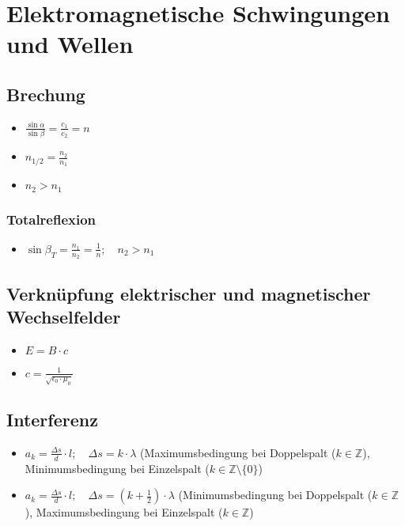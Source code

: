 \documentclass[paper = a4, twocolumn]{scrartcl}
\begin{document}
\section{Elektromagnetische Schwingungen und Wellen}
\subsection{Brechung}
\begin{itemize}
\item
	\( \frac{\sin \alpha}{\sin \beta} = \frac{c_1}{c_2} = n \)
\item
	\( n_{1/2} = \frac{n_2}{n_1} \)
\item
	\( n_2 > n_1 \)
\end{itemize}

\subsubsection{Totalreflexion}
\begin{itemize}
\item
	\( \sin \beta_T = \frac{n_1}{n_2} = \frac{1}{n}; \quad n_2 > n_1 \)
\end{itemize}

\subsection{Verknüpfung elektrischer und magnetischer Wechselfelder}
\begin{itemize}
\item
	\( E = B \cdot c \)
\item
	\( c = \frac{1}{\sqrt{\epsilon_0 \cdot \mu_0}} \)
\end{itemize}

\subsection{Interferenz}
\begin{itemize}
\item
	\( a_k = \frac{\Delta s}{d} \cdot l; \quad \Delta s = k \cdot \lambda \)
	(Maximumsbedingung bei Doppelspalt (\( k \in \mathbb{Z} \)),
	Minimumsbedingung bei Einzelspalt (\( k \in \mathbb{Z}\setminus\{0\} \))
\item
	\( a_k = \frac{\Delta s}{d} \cdot l; \quad \Delta s = (k + \frac{1}{2})
	\cdot \lambda \) (Minimumsbedingung bei Doppelspalt (\( k \in
	\mathbb{Z} \)), Maximumsbedingung bei Einzelspalt (\( k
	\in \mathbb{Z} \))
\end{itemize}
\end{document}
